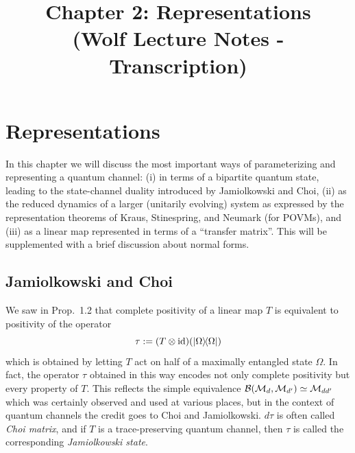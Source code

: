 \documentclass[11pt,a4paper]{article}
\title{Chapter 2: Representations \\ {\small (Wolf Lecture Notes - Transcription)}}
\date{}
\numberwithin{equation}{section}
\theoremstyle{plain}
\theoremstyle{definition}
\begin{document}
\maketitle
\tableofcontents

\setcounter{section}{1}

\section{Representations}

In this chapter we will discuss the most important ways of parameterizing and
representing a quantum channel:
(i) in terms of a bipartite quantum state, leading to the state-channel duality
introduced by Jamiolkowski and Choi,
(ii) as the reduced dynamics of a larger (unitarily evolving) system as expressed
by the representation theorems of Kraus, Stinespring, and Neumark (for POVMs),
and
(iii) as a linear map represented in terms of a ``transfer matrix''.
This will be supplemented with a brief discussion about normal forms.

\subsection{Jamiolkowski and Choi}

We saw in Prop.~1.2 that complete positivity of a linear map $T$ is equivalent to
positivity of the operator
\[
    \tau := (T \otimes \mathrm{id})(|\Omega\rangle\!\langle\Omega|)
\]
which is obtained by letting $T$ act on half of a maximally entangled state $\Omega$.
In fact, the operator $\tau$ obtained in this way encodes not only complete positivity
but every property of $T$. This reflects the simple equivalence
$\mathcal{B}(\mathcal{M}_d,\mathcal{M}_{d'}) \simeq \mathcal{M}_{dd'}$ which was certainly observed and
used at various places, but in the context of quantum channels the credit goes to
Choi and Jamiolkowski. $d\tau$ is often called \emph{Choi matrix}, and if $T$ is a
trace-preserving quantum channel, then $\tau$ is called the corresponding
\emph{Jamiolkowski state}.
\end{document}

